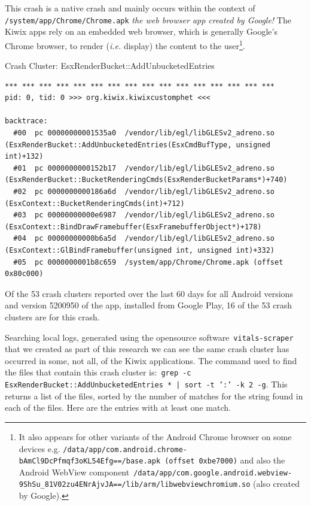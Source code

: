 This crash is a native crash and mainly occurs within the context of \texttt{/system/app/Chrome/Chrome.apk} \textit{the web browser app created by Google!} The Kiwix apps rely on an embedded web browser, which is generally Google's Chrome browser, to render (\emph{i.e.} display) the content to the user\footnote{It also appears for other variants of the Android Chrome browser on some devices e.g. \texttt{/data/app/com.android.chrome-bAmCl9DcPfmqf3oKL54Efg==/base.apk (offset 0xbe7000)} and also the Android WebView component~\texttt{/data/app/com.google.android.webview-9ShSu\_81V02zu4ENrAjvJA==/lib/arm/libwebviewchromium.so} (also created by Google).}.

\begin{listing}[H]
\caption{Crash Cluster: EsxRenderBucket::AddUnbucketedEntries} \label{code:crash_cluster_add_unbucketed_entries}
\tiny
\begin{verbatim}
*** *** *** *** *** *** *** *** *** *** *** *** *** *** *** ***
pid: 0, tid: 0 >>> org.kiwix.kiwixcustomphet <<<

backtrace:
  #00  pc 00000000001535a0  /vendor/lib/egl/libGLESv2_adreno.so (EsxRenderBucket::AddUnbucketedEntries(EsxCmdBufType, unsigned int)+132)
  #01  pc 0000000000152b17  /vendor/lib/egl/libGLESv2_adreno.so (EsxRenderBucket::BucketRenderingCmds(EsxRenderBucketParams*)+740)
  #02  pc 0000000000186a6d  /vendor/lib/egl/libGLESv2_adreno.so (EsxContext::BucketRenderingCmds(int)+712)
  #03  pc 00000000000e6987  /vendor/lib/egl/libGLESv2_adreno.so (EsxContext::BindDrawFramebuffer(EsxFramebufferObject*)+178)
  #04  pc 00000000000b6a5d  /vendor/lib/egl/libGLESv2_adreno.so (EsxContext::GlBindFramebuffer(unsigned int, unsigned int)+332)
  #05  pc 0000000001b8c659  /system/app/Chrome/Chrome.apk (offset 0x80c000)
\end{verbatim}

\end{listing}

Of the 53 crash clusters reported over the last 60 days for all Android versions and version 5200950 of the app, installed from Google Play, 16 of the 53 crash clusters are for this crash.

Searching local logs, generated using the opensource software~\texttt{vitals-scraper} that we created as part of this research we can see the same crash cluster has occurred in some, not all, of the Kiwix applications. The command used to find the files that contain this crash cluster is:~\texttt{grep -c EsxRenderBucket::AddUnbucketedEntries * | sort -t ':' -k 2 -g}. This returns a list of the files, sorted by the number of matches for the string found in each of the files. Here are the entries with at least one match.

